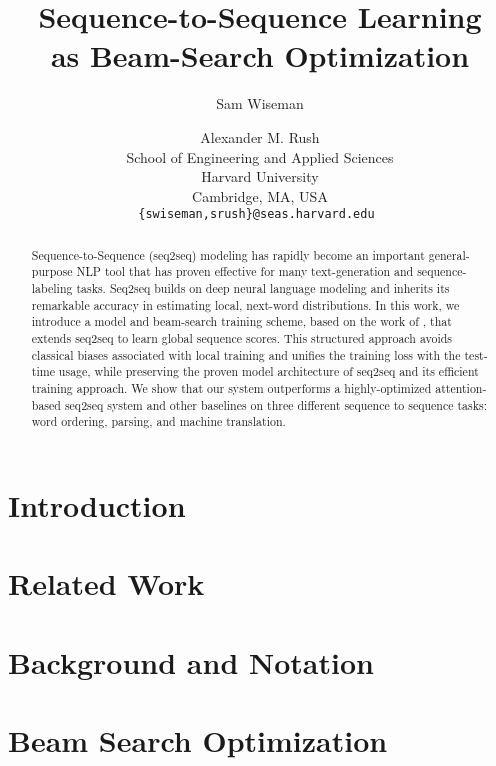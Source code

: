\documentclass[11pt,letterpaper]{article}
\title{Sequence-to-Sequence Learning \\ as Beam-Search Optimization}
\author{Sam Wiseman \and Alexander M. Rush\\
 School of Engineering and Applied Sciences \\ Harvard University \\ Cambridge, MA, USA \\ {\tt \{swiseman,srush\}@seas.harvard.edu }}
\date{}
\begin{document}
\maketitle

\begin{abstract}
  Sequence-to-Sequence (seq2seq) modeling has rapidly become an
  important general-purpose NLP tool that has proven effective for
  many text-generation and sequence-labeling tasks. Seq2seq builds on deep neural language modeling and inherits its
  remarkable accuracy in estimating local, next-word
  distributions. In this work, we introduce a model and beam-search training
  scheme, based on the work of , that extends
  seq2seq to learn global sequence scores. This
  structured approach avoids classical biases associated with local
  training and unifies the training loss with the test-time usage,
  while preserving the proven model architecture of seq2seq and
  its efficient training approach. We show that our system outperforms a
  highly-optimized attention-based seq2seq system and other baselines
  on three different sequence to sequence tasks: word ordering,
  parsing, and machine translation.
\end{abstract}


\section{Introduction}


\section{Related Work}
\label{sec:relatedwork}


\section{Background and Notation}
\label{sec:background}


\section{Beam Search Optimization}


%
\end{document}
